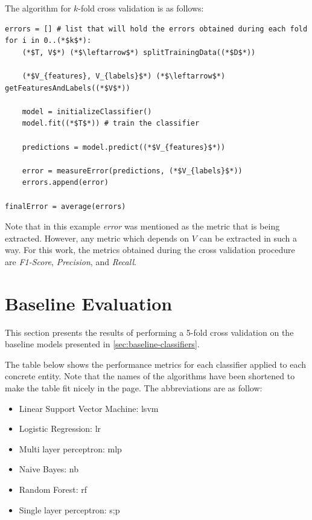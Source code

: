 \documentclass[epsfig,a4paper,11pt,titlepage,twoside,openany]{book}
\begin{document}
The algorithm for $k$-fold cross validation is as follows:

\begin{lstlisting}
errors = [] # list that will hold the errors obtained during each fold
for i in 0..(*$k$*):
    (*$T, V$*) (*$\leftarrow$*) splitTrainingData((*$D$*))
    
    (*$V_{features}, V_{labels}$*) (*$\leftarrow$*) getFeaturesAndLabels((*$V$*))
    
    model = initializeClassifier()
    model.fit((*$T$*)) # train the classifier
    
    predictions = model.predict((*$V_{features}$*))
    
    error = measureError(predictions, (*$V_{labels}$*))
    errors.append(error)
    
finalError = average(errors)
\end{lstlisting}

Note that in this example \textit{error} was mentioned as the metric that is being extracted. However, any metric which depends on $V$ can be extracted in such a way. For this work, the metrics obtained during the cross validation procedure are \textit{F1-Score}, \textit{Precision}, and \textit{Recall}.


\section{Baseline Evaluation}
\label{sec:baseline-evaluation}

This section presents the results of performing a 5-fold cross validation on the baseline models presented in \autoref{sec:baseline-classifiers}. 

The table below shows the performance metrics for each classifier applied to each concrete entity. Note that the names of the algorithms have been shortened to make the table fit nicely in the page. The abbreviations are as follow:

\begin{itemize}
    \item Linear Support Vector Machine: lsvm
    \item Logistic Regression: lr
    \item Multi layer perceptron: mlp
    \item Naive Bayes: nb
    \item Random Forest: rf
    \item Single layer perceptron: s;p
\end{itemize}
\end{document}
